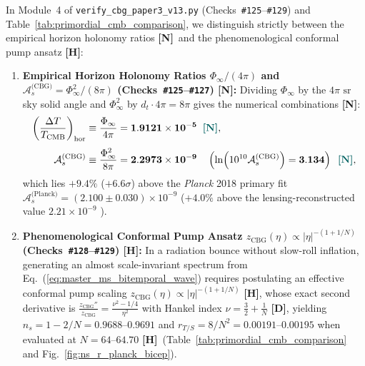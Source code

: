 \documentclass[11pt,a4paper]{article}
\newcommand{\catD}{\textbf{\textcolor{blue!75!black}{[D]}}}
\newcommand{\catH}{\textbf{\textcolor{orange!85!black}{[H]}}}
\newcommand{\catN}{\textbf{\textcolor{teal!75!black}{[N]}}}
\theoremstyle{plain}
\theoremstyle{definition}
\theoremstyle{remark}
\numberwithin{equation}{section}
\begin{document}
In Module~4 of \allowbreak\texttt{verify\_cbg\_paper3\_v13.py} (Checks~\texttt{\#125}--\texttt{\#129}) and Table~\ref{tab:primordial_cmb_comparison}, we distinguish strictly between the empirical horizon holonomy ratios \catN\ and the phenomenological conformal pump ansatz \catH:
\begin{enumerate}
  \item \textbf{Empirical Horizon Holonomy Ratios $\Phi_{\infty}/(4\pi)$ and $\mathcal{A}_s^{\text{(CBG)}} = \Phi_{\infty}^2/(8\pi)$ (Checks~\texttt{\#125}--\texttt{\#127}) \catN:} Dividing $\Phi_{\infty}$ by the $4\pi\text{ sr}$ sky solid angle and $\Phi_{\infty}^2$ by $d_t \cdot 4\pi = 8\pi$ gives the numerical combinations \catN:
  \begin{align}
  \left(\frac{\Delta T}{T_{\text{CMB}}}\right)_{\text{hor}} &\equiv \frac{\Phi_{\infty}}{4\pi} = \mathbf{1.9121 \times 10^{-5}} \;\;\catN, \nonumber \\[3pt]
  \mathcal{A}_s^{\text{(CBG)}} &\equiv \frac{\Phi_{\infty}^2}{8\pi} = \mathbf{2.2973 \times 10^{-9}} \quad \left(\ln\!\left(10^{10}\mathcal{A}_s^{\text{(CBG)}}\right) = \mathbf{3.134}\right) \;\;\catN,
  \label{eq:exact_as_amplitude}
  \end{align}
  which lies $+9.4\%$ ($+6.6\sigma$) above the \textit{Planck} 2018 primary fit $\mathcal{A}_s^{\text{(Planck)}} = (2.100 \pm 0.030) \times 10^{-9}$ ($+4.0\%$ above the lensing-reconstructed value $2.21 \times 10^{-9}$ \cite{planck2018_vi}).
  \item \textbf{Phenomenological Conformal Pump Ansatz $z_{\text{CBG}}(\eta) \propto \lvert\eta\rvert^{-(1+1/N)}$ (Checks~\texttt{\#128}--\texttt{\#129}) \catH:} In a radiation bounce without slow-roll inflation, generating an almost scale-invariant spectrum from Eq.~(\ref{eq:master_ms_bitemporal_wave}) requires postulating an effective conformal pump scaling $z_{\text{CBG}}(\eta) \propto \lvert\eta\rvert^{-(1+1/N)}$ \catH, whose exact second derivative is $\frac{z_{\text{CBG}}''}{z_{\text{CBG}}} = \frac{\nu^2 - 1/4}{\eta^2}$ with Hankel index $\nu = \frac{3}{2} + \frac{1}{N}$ \catD, yielding $n_s = 1 - 2/N = 0.9688\text{--}0.9691$ and $r_{T/S} = 8/N^2 = 0.00191\text{--}0.00195$ when evaluated at $N = 64\text{--}64.70$ \catH\ (Table~\ref{tab:primordial_cmb_comparison} and Fig.~\ref{fig:ns_r_planck_bicep}).
\end{enumerate}
\end{document}

